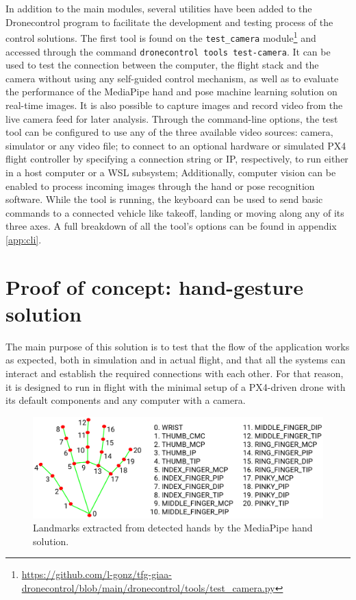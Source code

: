 In addition to the main modules, several utilities have been added to the Dronecontrol program to facilitate the development and testing process of the control solutions.
The first tool is found on the \texttt{test\_camera} module\footnote{\url{https://github.com/l-gonz/tfg-giaa-dronecontrol/blob/main/dronecontrol/tools/test_camera.py}} and accessed through the command \texttt{dronecontrol tools test-camera}.
It can be used to test the connection between the computer, the flight stack and the camera without using any self-guided control mechanism, as well as to evaluate the performance of the MediaPipe hand and pose machine learning solution on real-time images.
It is also possible to capture images and record video from the live camera feed for later analysis.
Through the command-line options, the test tool can be configured to use any of the three available video sources: camera, simulator or any video file; to connect to an optional hardware or simulated PX4 flight controller by specifying a connection string or IP, respectively,
to run either in a host computer or a WSL subsystem;
Additionally, computer vision can be enabled to process incoming images through the hand or pose recognition software.
While the tool is running, the keyboard can be used to send basic commands to a connected vehicle like takeoff, landing or moving along any of its three axes.
A full breakdown of all the tool's options can be found in appendix \ref{app:cli}.


\section{Proof of concept: hand-gesture solution}
\label{sec:hands}
The main purpose of this solution is to test that the flow of the application works as expected, both in simulation and in actual flight, and that all the systems can interact and establish the required connections with each other.
For that reason, it is designed to run in flight with the minimal setup of a PX4-driven drone with its default components and any computer with a camera.

\begin{figure}
  \centering
  \includegraphics[width=\textwidth, keepaspectratio]{img/hand_landmarks.png}
  \caption{Landmarks extracted from detected hands by the MediaPipe hand solution.}
  \label{fig:hand-landmarks}
\end{figure}


